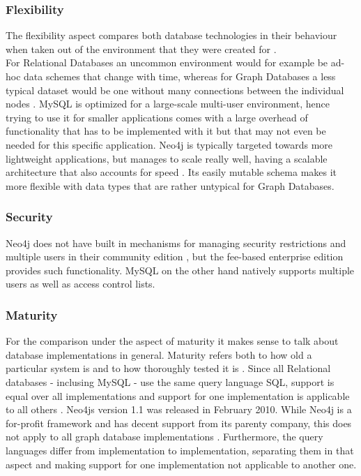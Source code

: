 \subsubsection{Flexibility}
The flexibility aspect compares both database technologies in their behaviour when taken out of the environment that they were created for \autocite{Vicknair2010}. \\
For Relational Databases an uncommon environment would for example be ad-hoc data schemes that change with time, whereas for Graph Databases a less typical dataset would be one without many connections between the individual nodes  \autocite{GarimaAnalysis}.
MySQL is optimized for a large-scale multi-user environment, hence trying to use it for smaller applications comes with a large overhead of functionality that has to be implemented with it but that may not even be needed for this specific application.
Neo4j is typically targeted towards more lightweight applications, but manages to scale really well, having a scalable architecture that also accounts for speed \autocite{neo4jweb}. Its easily mutable schema makes it more flexible with data types that are rather untypical for Graph Databases.

\subsubsection{Security}
Neo4j does not have built in mechanisms for managing security restrictions and multiple users in their community edition \autocite{GarimaAnalysis}, but the fee-based enterprise edition provides such functionality. MySQL on the other hand natively supports multiple users as well as access control lists. \autocite{mysqlsecurity}

\subsubsection{Maturity}
For the comparison under the aspect of maturity it makes sense to talk about database implementations in general. Maturity refers both to how old a particular system is and to how thoroughly tested it is \autocite{Vicknair2010}.
Since all Relational databases - inclusing MySQL - use the same query language SQL, support is equal over all implementations and support for one implementation is applicable to all others \autocite{GarimaAnalysis}.
Neo4js version 1.1 was released in February 2010. While Neo4j is a for-profit framework and has decent support from its parenty company, this does not apply to all graph database implementations \autocite{Vicknair2010}. Furthermore, the query languages differ from implementation to implementation, separating them in that aspect and making support for one implementation not applicable to another one.

